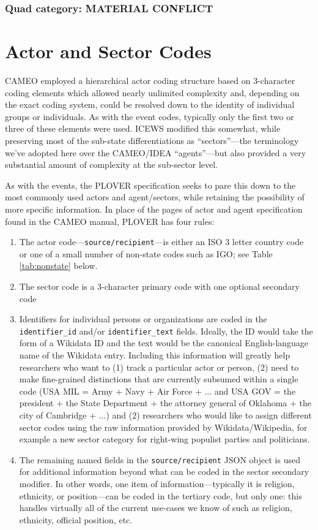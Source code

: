 \documentclass[11pt]{report}
\begin{document}
 
\subsection{Quad category: MATERIAL CONFLICT}



\chapter{Actor and Sector Codes}

CAMEO employed a hierarchical actor coding structure based on 3-character coding elements which allowed nearly unlimited complexity and, depending on the exact coding system, could be resolved down to the identity of individual groups or individuals. As with the event codes, typically only the first two or three of these elements were used. ICEWS modified this somewhat, while preserving most of the sub-state differentiations as ``sectors''---the terminology we've adopted here over the CAMEO/IDEA ``agents''---but also provided a very substantial amount of complexity at the sub-sector level.

As with the events, the PLOVER specification seeks to pare this down to the most commonly used actors and agent/sectors, while retaining the possibility of more specific information. In place of the pages of actor and agent specification found in the CAMEO manual, PLOVER has four rules:

\begin{enumerate}
\item The actor code---\texttt{source/recipient}---is either an ISO 3 letter country code or one of a small number of non-state codes such as IGO; see Table \ref{tab:nonstate} below.
\item The sector code is a 3-character primary code with one optional secondary code
\item Identifiers for individual persons or organizations are coded in the \texttt{identifier\_id} and/or \texttt{identifier\_text} fields. Ideally, the ID would take the form of a Wikidata ID and the text would be the canonical English-language name of the Wikidata entry. Including this information will greatly help researchers who want to (1) track a particular actor or person, (2) need to make fine-grained distinctions that are currently subsumed within a single code (USA MIL = Army + Navy + Air Force + ... and USA GOV = the president + the State Department + the attorney general of Oklahoma + the city of Cambridge + ...) and (2) researchers who would like to assign different sector codes using the raw information provided by Wikidata/Wikipedia, for example a new sector category for right-wing populist parties and politicians.
\item The remaining named fields in the \texttt{source/recipient} JSON object is used for additional information beyond what can be coded in the sector secondary modifier. In other words, one item of information---typically it is religion, ethnicity, or position---can be coded in the tertiary code, but only one: this handles virtually all of the current use-cases we know of such as religion, ethnicity, official position, etc.
\end{enumerate}
\end{document}
